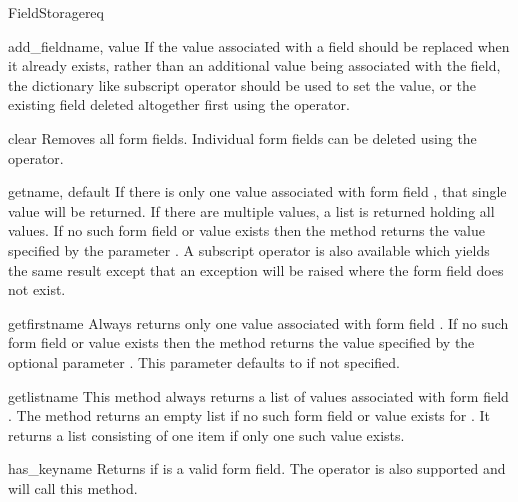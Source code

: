 \begin{classdesc}{FieldStorage}{req}
\begin{methoddesc}[FieldStorage]{add_field}{name, value}
    If the value associated with a field should be replaced when it
    already exists, rather than an additional value being associated
    with the field, the dictionary like subscript operator should
    be used to set the value, or the existing field deleted altogether
    first using the  operator.
  \end{methoddesc}

  \begin{methoddesc}[FieldStorage]{clear}{}
    Removes all form fields. Individual form fields can be deleted
    using the  operator.
  \end{methoddesc}

  \begin{methoddesc}[FieldStorage]{get}{name, default}
    If there is only one value associated with form field , that
    single value will be returned. If there are multiple values, a list is
    returned holding all values. If no such form field or value exists then
    the method returns the value specified by the parameter .
    A subscript operator is also available which yields the same result
    except that an exception will be raised where the form field 
    does not exist.
  \end{methoddesc}

  \begin{methoddesc}[FieldStorage]{getfirst}{name}
    Always returns only one value associated with form field
    . If no such form field or value exists then the method
    returns the value specified by the optional parameter
    . This parameter defaults to  if not
    specified.
  \end{methoddesc}

  \begin{methoddesc}[FieldStorage]{getlist}{name}
    This method always returns a list of values associated with form
    field . The method returns an empty list if no such form
    field or value exists for . It returns a list consisting
    of one item if only one such value exists.
  \end{methoddesc}

  \begin{methoddesc}[FieldStorage]{has_key}{name}
    Returns  if  is a valid form field. The 
    operator is also supported and will call this method.
  \end{methoddesc}


\end{classdesc}
